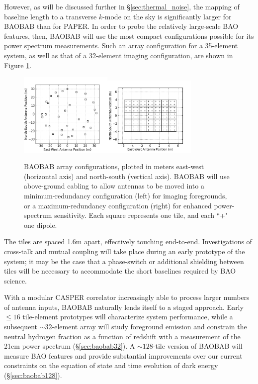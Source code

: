 \documentclass[10pt,iop]{emulateapj}
\begin{document}
However, as will be discussed further in \S\ref{sec:thermal_noise}, the mapping of
baseline length to a transverse $k$-mode on the sky is significantly larger for BAOBAB
than for PAPER.  In order to probe the relatively large-scale BAO features, then, BAOBAB will
use the most compact configurations possible for its power spectrum measurements.
Such an array configuration for a 35-element system, as well as that of a 32-element 
imaging configuration, 
are shown in Figure \ref{fig:configuration}.  
\begin{figure}\centering
\includegraphics[width=1.75in]{antpos32min.png}\includegraphics[width=1.75in]{antpos32max.png}
\caption{BAOBAB array configurations, plotted in meters east-west 
(horizontal axis) and north-south (vertical axis).  BAOBAB will use above-ground
cabling to allow antennas to be moved into
a minimum-redundancy configuration (left) for imaging foregrounds, or
a maximum-redundancy configuration (right) for enhanced power-spectrum sensitivity.
Each square represents one tile, and each ``+" one dipole.
}
\label{fig:configuration}
\end{figure}
The tiles are spaced 1.6m apart, effectively touching 
end-to-end.  Investigations of cross-talk and mutual coupling will take place during an early
prototype of the system; it may be the case that a phase-switch or additional shielding between
tiles will be necessary to accommodate the short baselines required by BAO science.

With a modular CASPER correlator increasingly able to process larger numbers of antenna inputs, 
BAOBAB naturally lends itself to a staged approach.  Early $\leq 16$ tile-element prototypes 
will characterize system performance, while a subsequent
$\sim32$-element array will study foreground emission and 
constrain the neutral hydrogen fraction as a function of redshift 
with a measurement of the 21cm power
spectrum (\S\ref{sec:baobab32}).  A $\sim128$-tile version of BAOBAB 
will measure BAO features and provide substantial improvements over our current
constraints on the equation of state and time evolution of dark energy (\S\ref{sec:baobab128}). 
\end{document}

